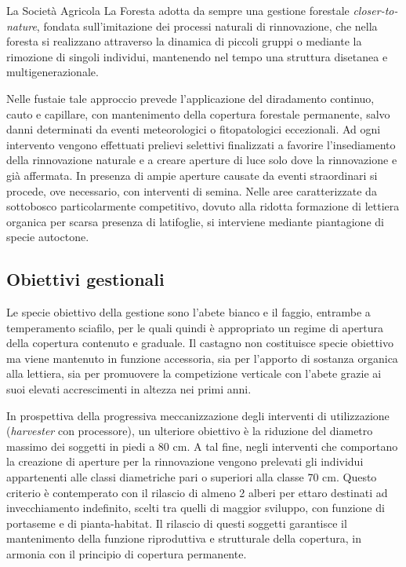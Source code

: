 La Società Agricola La Foresta adotta da sempre una gestione forestale
{\em closer-to-nature}, fondata sull'imitazione dei processi naturali di rinnovazione,
che nella foresta si realizzano attraverso la dinamica di piccoli gruppi o
mediante la rimozione di singoli individui, mantenendo nel tempo una struttura
disetanea e multigenerazionale.

Nelle fustaie tale approccio prevede l'applicazione del diradamento continuo,
cauto e capillare, con mantenimento della copertura forestale permanente, salvo
danni determinati da eventi meteorologici o fitopatologici eccezionali. Ad ogni
intervento vengono effettuati prelievi selettivi finalizzati a favorire
l'insediamento della rinnovazione naturale e a creare aperture di luce solo dove
la rinnovazione e già affermata. In presenza di ampie aperture causate da eventi
straordinari si procede, ove necessario, con interventi di semina. Nelle aree
caratterizzate da sottobosco particolarmente competitivo, dovuto alla ridotta
formazione di lettiera organica per scarsa presenza di latifoglie, si interviene
mediante piantagione di specie autoctone.

\subsection{Obiettivi gestionali}

Le specie obiettivo della gestione sono l'abete bianco e il faggio, entrambe a
temperamento sciafilo, per le quali quindi è appropriato un regime di apertura
della copertura contenuto e graduale. Il castagno non costituisce specie
obiettivo ma viene mantenuto in funzione accessoria, sia per l'apporto di
sostanza organica alla lettiera, sia per promuovere la competizione verticale
con l'abete grazie ai suoi elevati accrescimenti in altezza nei primi anni.

In prospettiva della progressiva meccanizzazione degli interventi di
utilizzazione ({\em harvester} con processore), un ulteriore obiettivo è la
riduzione del diametro massimo dei soggetti in piedi a 80 cm. A tal fine, negli
interventi che comportano la creazione di aperture per la rinnovazione vengono
prelevati gli individui appartenenti alle classi diametriche pari o superiori
alla classe 70 cm. Questo criterio è contemperato con il rilascio di almeno 2
alberi per ettaro destinati ad invecchiamento indefinito, scelti tra quelli di
maggior sviluppo, con funzione di portaseme e di pianta-habitat. Il rilascio di
questi soggetti garantisce il mantenimento della funzione riproduttiva e
strutturale della copertura, in armonia con il principio di copertura
permanente.

